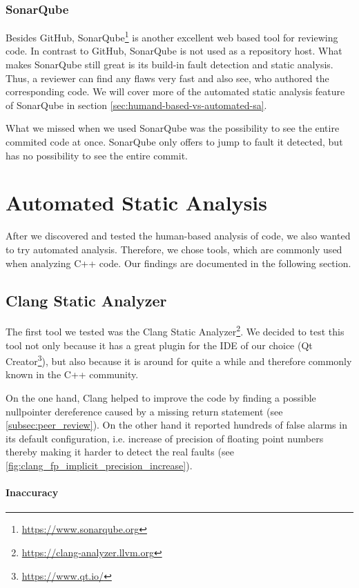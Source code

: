 \documentclass{scrreprt}
\begin{document}
\subsubsection{SonarQube}

Besides GitHub, SonarQube\footnote{\url{https://www.sonarqube.org}} is another excellent web based tool for reviewing code. In contrast to GitHub, SonarQube is not used as a repository host. What makes SonarQube still great is its build-in fault detection and static analysis. Thus, a reviewer can find any flaws very fast and also see, who authored the corresponding code. We will cover more of the automated static analysis feature of SonarQube in section \ref{sec:humand-based-vs-automated-sa}.

What we missed when we used SonarQube was the possibility to see the entire commited code at once. SonarQube only offers to jump to fault it detected, but has no possibility to see the entire commit.

\section{Automated Static Analysis}

After we discovered and tested the human-based analysis of code, we also wanted to try automated analysis. Therefore, we chose tools, which are commonly used when analyzing C++ code. Our findings are documented in the following section.

\subsection{Clang Static Analyzer}

The first tool we tested was the Clang Static Analyzer\footnote{\url{https://clang-analyzer.llvm.org}}. We decided to test this tool not only because it has a great plugin for the IDE of our choice (Qt Creator\footnote{\url{https://www.qt.io/}}), but also because it is around for quite a while and therefore commonly known in the C++ community.

On the one hand, Clang helped to improve the code by finding a possible nullpointer dereference caused by a missing return statement (see \vref{subsec:peer_review}). 
On the other hand it reported hundreds of false alarms in its default configuration, i.e. increase of precision of floating point numbers thereby making it harder to detect the real faults (see \vref{fig:clang_fp_implicit_precision_increase}).

\paragraph{Inaccuracy}
\end{document}
